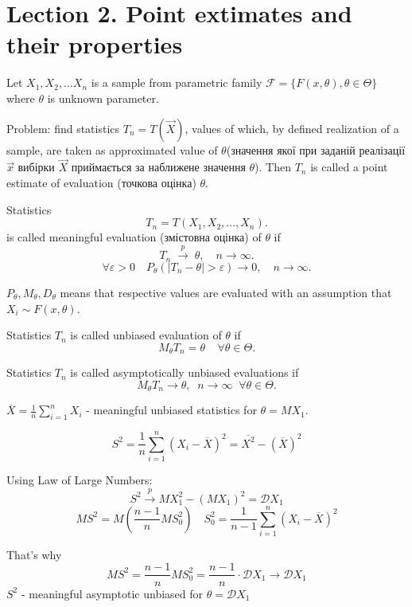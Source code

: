 \section{Lection 2. Point extimates and their properties}

Let \(X_1, X_2, \ldots X_n\) is a sample from parametric
family \(\mathcal{F} = \{ F(x, \theta), \theta \in \Theta \}\)
where \(\theta\) is unknown parameter.

Problem: find statistics $T_n = T\left( \vec{X} \right) $, values
of which, by defined realization of a sample, are taken as
approximated value of $\theta$(значення якої при заданій реалізації
$\vec{x}$ вибірки $\vec{X}$ приймається за наближене значення $\theta$).
Then $T_n$ is called a point estimate of evaluation (точкова оцінка) $\theta$.

\begin{definition}
    Statistics \[
    T_n = T(X_1,X_2, \ldots, X_n)
    .\] 
    is called meaningful evaluation (змістовна оцінка) of $\theta$ if \[
    T_n \; \overset{p}{\rightarrow} \; \theta, \quad n \to \infty
    .\] 
    \[
    \forall \varepsilon > 0 \quad
    P_{\theta} \left( \left| T_n - \theta \right| > \varepsilon \right) \to 0, \quad
    n \to \infty
    .\] 
\end{definition}

\begin{remark}
    $P_{\theta}, M_{\theta}, D_{\theta}$ means that respective values
    are evaluated with an assumption that $X_i \sim F(x, \theta)$.
\end{remark}

\begin{definition}
    Statistics $T_n$ is called unbiased evaluation of $\theta$ if \[
    M_{\theta}T_{n} = \theta \;\;\;\; \forall \theta \in \Theta
    .\] 
\end{definition}

\begin{definition}
    Statistics $T_n$ is called asymptotically unbiased evaluations if \[
    M_{\theta} T_n \to \theta, \;\; n\to \infty \;\; \forall \theta \in \Theta
    .\] 
\end{definition}

\begin{example}
    $\overline{X} = \frac{1}{n} \sum_{i=1}^{n} X_i$ - meaningful
    unbiased statistics for $\theta = MX_1$.
\end{example}

\begin{example}
    \[ S^2 = \frac{1}{n} \sum_{i=1}^{n} \left( X_i - \overline{X} \right) ^2
    = \overline{X^2} - \left( \overline{X} \right) ^2 \]

    Using Law of Large Numbers:
    \[
    S^2 \overset{p}{\to} MX_1^2 - \left( MX_1 \right) ^2 = \mathcal{D}X_1
    \] 
    \[
    MS^2 = M \left(\frac{n-1}{n} MS_0^2\right) \quad
    S_0^2 = \frac{1}{n-1} \sum_{i=1}^{n} \left( X_i - \overline{X} \right) ^2
    \]

    That's why \[
    MS^2 = \frac{n-1}{n} MS_0^2 = \frac{n-1}{n} \cdot \mathcal{D} X_1 \to \mathcal{D}X_1
    \]  
    $S^2$ - meaningful asymptotic unbiased for $\theta = \mathcal{D}X_1$
\end{example}

